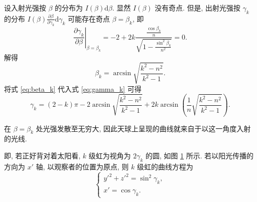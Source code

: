 \documentclass{article}
\begin{document}
设入射光强按 $\beta$ 的分布为 $I\left(\beta\right)\mathrm d\beta$.
显然 $I\left(\beta\right)$ 没有奇点.
但是, 出射光强按 $\gamma_k$ 的分布 $I\left(\beta\right)\frac{\partial\beta}{\partial\gamma_k}\mathrm d\gamma_k$ 可能存在奇点 $\beta=\beta_k$,
即
\begin{equation}
	\left.\frac{\partial\gamma_k}{\partial\beta}\right|_{\beta=\beta_k}=-2+2k\frac{\frac{\cos\beta_k}n}{\sqrt{1-\frac{\sin^2\beta_k}{n^2}}}=0.
\end{equation}
解得
\begin{equation}
	\label{eq:beta_k}
	\beta_k=\arcsin\sqrt{\frac{k^2-n^2}{k^2-1}}.
\end{equation}
将式 \ref{eq:beta_k} 代入式 \ref{eq:gamma_k} 可得
\begin{equation}
	\gamma_k=\left(2-k\right)\pi-2\arcsin\sqrt{\frac{k^2-n^2}{k^2-1}}+2k\arcsin\left(\frac1n\sqrt{\frac{k^2-n^2}{k^2-1}}\right).
	\label{eq:完整的gamma_k}
\end{equation}

在 $\beta=\beta_k$ 处光强发散至无穷大, 因此天球上呈现的曲线就来自于以这一角度入射的光线.

\begin{figure}[h!]
	\centering
	\caption{}
	\label{fig:总光路图}
\end{figure}

即, 若正好背对着太阳看, $k$ 级虹为视角为 $2\gamma_k$ 的圆, 如图 \ref{fig:总光路图} 所示.
若以阳光传播的方向为 $x'$ 轴, 以观察者的位置为原点, 则 $k$ 级虹的曲线方程为
\begin{equation}
	\begin{cases}
		y'^2+z'^2=\sin^2\gamma_k,\\
		x'=\cos\gamma_k.
	\end{cases}
	\label{eq:换系前}
\end{equation}
\end{document}
